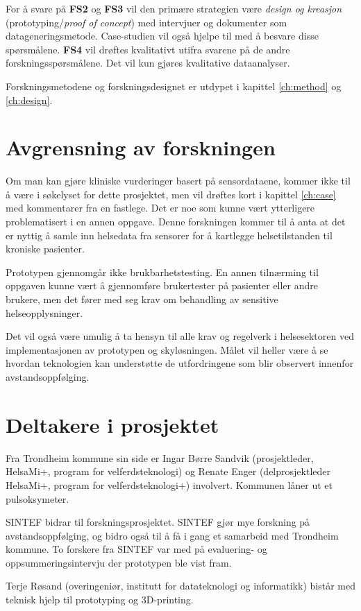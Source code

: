 For å svare på \textbf{FS2} og \textbf{FS3} vil den primære strategien være \textit{design og kreasjon} (prototyping/\textit{proof of concept})
med intervjuer og dokumenter som datageneringsmetode. Case-studien vil også hjelpe til med å besvare disse spørsmålene. \textbf{FS4} vil drøftes kvalitativt 
utifra svarene på de andre forskningsspørsmålene. Det vil kun gjøres kvalitative dataanalyser.

Forskningsmetodene og forskningsdesignet er utdypet i kapittel \ref{ch:method} og \ref{ch:design}.

\section{Avgrensning av forskningen}
Om man kan gjøre kliniske vurderinger basert på sensordataene, kommer ikke til å være i søkelyset for dette prosjektet,
men vil drøftes kort i kapittel \ref{ch:case} med kommentarer fra en fastlege. Det er noe som kunne vært ytterligere problematisert i en annen oppgave.
Denne forskningen kommer til å anta at det er nyttig å samle inn helsedata fra sensorer for å kartlegge helsetilstanden til kroniske pasienter.

Prototypen gjennomgår ikke brukbarhetstesting. En annen tilnærming til oppgaven kunne vært å gjennomføre brukertester på pasienter eller andre brukere, men det
fører med seg krav om behandling av sensitive helseopplysninger. %

Det vil også være umulig å ta hensyn til alle krav og regelverk i helsesektoren ved implementasjonen av prototypen og skyløsningen. Målet vil heller
være å se hvordan teknologien kan understøtte de utfordringene som blir observert innenfor avstandsoppfølging.

\section{Deltakere i prosjektet}
Fra Trondheim kommune sin side er Ingar Børre Sandvik (prosjektleder, HelsaMi+, program for velferdsteknologi) og Renate Enger
(delprosjektleder HelsaMi+, program for velferdsteknologi+) involvert. Kommunen låner ut et pulsoksymeter.

SINTEF bidrar til forskningsprosjektet. SINTEF gjør mye forskning på
avstandsoppfølging, og bidro også til å få i gang et samarbeid med Trondheim kommune.
To forskere fra SINTEF var med på evaluering- og oppsummeringsintervju der prototypen
ble vist fram.

Terje Røsand (overingeniør, institutt for datateknologi og informatikk) bistår med teknisk hjelp til prototyping og 3D-printing.

